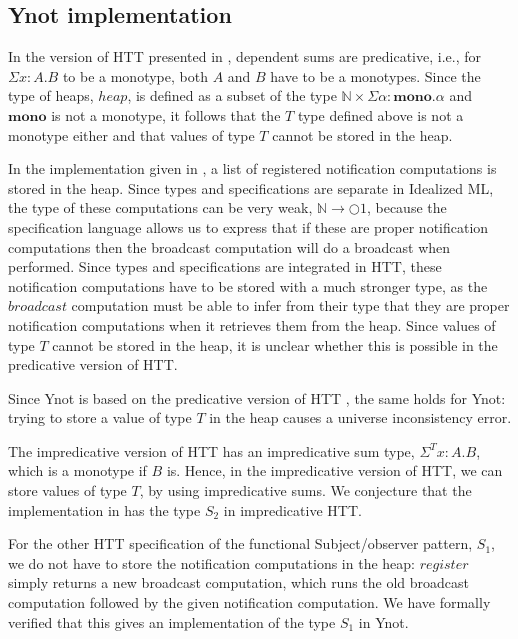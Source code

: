 \documentclass[a4paper,english]{article}
\newcommand{\N}[0]{\mathbb{N}}
\newcommand{\MONAD}[0]{\bigcirc}
\newcommand{\MONO}[0]{\mathbf{mono}}
\begin{document}
\subsection{Ynot implementation}

In the version of HTT presented in \cite{htthol-conf}, dependent sums are
predicative, i.e., for $\Sigma x : A. B$ to be a monotype, both $A$ and $B$
have to be a monotypes. Since the type of heaps, $heap$, is defined as a subset
of the type $\N \times \Sigma \alpha : \MONO. \alpha$ and $\MONO$ is not a
monotype, it follows that the $T$ type defined above is not a monotype either
and that values of type $T$ cannot be stored in the heap. 

In the implementation given in \cite{patterns}, a list of registered
notification computations is stored in the heap. Since types and specifications
are separate in Idealized ML, the type of these computations can be very weak,
$\N \rightarrow \MONAD 1$, because the specification language allows us to
express that if these are proper notification computations then the broadcast
computation will do a broadcast when performed. Since types and specifications
are integrated in HTT, these notification computations have to be stored with a
much stronger type, as the $broadcast$ computation must be able to infer from
their type that they are proper notification computations when it retrieves
them from the heap. Since values of type $T$ cannot be stored in the heap, it
is unclear whether this is possible in the predicative version of HTT.

Since Ynot is based on the predicative version of HTT \cite{htthol-conf}, the
same holds for Ynot: trying to store a value of type $T$ in the heap causes a
universe inconsistency error. 

The impredicative version of HTT \cite{httmodel-conf} has an impredicative sum
type, $\Sigma^T x : A. B$, which is a monotype if $B$ is. Hence, in the
impredicative version of HTT, we can store values of type $T$, by using
impredicative sums. We conjecture that the implementation in \cite{patterns}
has the type $S_2$ in impredicative HTT. 

For the other HTT specification of the functional Subject/observer pattern,
$S_1$, we do not have to store the notification computations in the heap:
$register$ simply returns a new broadcast computation, which runs the old
broadcast computation followed by the given notification computation. We have
formally verified that this gives an implementation of the type $S_1$ in Ynot.\\
\end{document}
